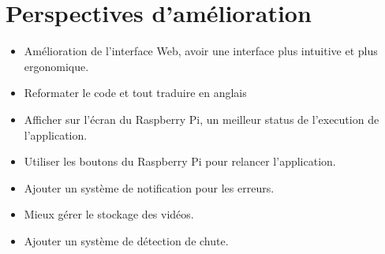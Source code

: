\documentclass[a4paper, 11pt, french]{article}
\begin{document}
\section{Perspectives d'amélioration}
\begin{itemize}
  \item Amélioration de l'interface Web, avoir une interface plus intuitive et plus ergonomique.
  \item Reformater le code et tout traduire en anglais
  \item Afficher sur l'écran du Raspberry Pi, un meilleur status de l'execution de l'application.
  \item Utiliser les boutons du Raspberry Pi pour relancer l'application.
  \item Ajouter un système de notification pour les erreurs.
  \item Mieux gérer le stockage des vidéos.
  \item Ajouter un système de détection de chute.
\end{itemize}














      
\end{document}
